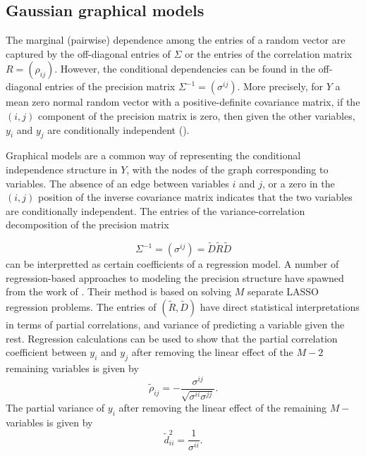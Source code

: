 \bigskip

\subsection{Gaussian graphical models} 

The marginal (pairwise) dependence among the entries of a random vector are captured by the off-diagonal entries of $\Sigma$ or the entries of the correlation matrix $R = \left(\rho_{ij}\right)$. However, the conditional dependencies can be found in the off-diagonal entries of the precision matrix $\Sigma^{-1} = \left( \sigma^{ij} \right)$. More precisely, for $Y$ a mean zero normal random vector with a positive-definite covariance matrix, if the $\left(i,j\right)$ component of the precision matrix is zero, then given the other variables, $y_i$ and $y_j$ are conditionally independent (\cite{Anderson84a}). 

\bigskip

Graphical models are a common way of representing the conditional independence structure in $Y$, with the nodes of the graph corresponding to variables. The absence of an edge between variables $i$ and $j$, or a zero in the $\left(i,j\right)$ position of the inverse covariance matrix indicates that the two variables are conditionally independent. The entries of the variance-correlation decomposition of the precision matrix 

\begin{equation} \label{eq:inverse-covariance-decomposition}
\Sigma^{-1} = \left( \sigma^{ij}\right) = \tilde{D} \tilde{R} \tilde{D} 
\end{equation}
\noindent
can be interpretted as certain coefficients of a regression model. A number of regression-based approaches to modeling the precision structure have spawned from the work of \cite{Meinshausen2006highDimGraphs}. Their method is based on solving $M$ separate LASSO regression problems. The entries of $\left(\tilde{R}, \tilde{D}\right)$ have direct statistical interpretations in terms of partial correlations, and variance of predicting a variable given the rest. Regression calculations can be used to show that the partial correlation coefficient between $y_i$ and $y_j$ after removing the linear effect of the $M - 2$ remaining variables is given by 
\begin{equation} \label{eq:partial-correlation}
\tilde{\rho}_{ij}= -\frac{\sigma^{ij}}{\sqrt{\sigma^{ii}\sigma^{jj}}}.
\end{equation}
\noindent
The partial variance of $y_i$ after removing the linear effect of the remaining $M-$ variables is given by 
\begin{equation} \label{eq:partial-variance}
\tilde{d}^2_{ii}= \frac{1}{\sigma^{ii}}.
\end{equation}

